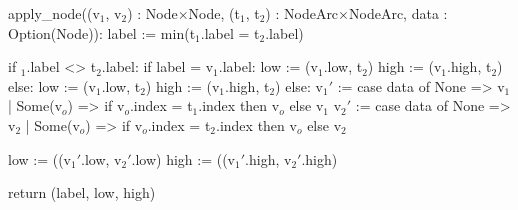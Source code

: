 \begin{blstlisting}
  apply_node((v$_1$, v$_2$) : Node$\times$Node,
             (t$_1$, t$_2$) : NodeArc$\times$NodeArc,
             data : Option(Node)):
      label := min(t$_1$.label = t$_2$.label)

      if $_1$.label <> t$_2$.label:
          if label = v$_1$.label:
              low := (v$_1$.low, t$_2$)
              high := (v$_1$.high, t$_2$)
          else:
              low := (v$_1$.low, t$_2$)
              high := (v$_1$.high, t$_2$)
      else:
          v$_1'$ := case data of None => v$_1$
                         | Some(v$_o$) => if v$_o$.index = t$_1$.index
                                     then v$_o$ else v$_1$
          v$_2'$ := case data of None => v$_2$
                         | Some(v$_o$) => if v$_o$.index = t$_2$.index
                                     then v$_o$ else v$_2$

          low := ((v$_1'$.low, v$_2'$.low)
          high := ((v$_1'$.high, v$_2'$.high)

      return (label, low, high)
\end{blstlisting}
